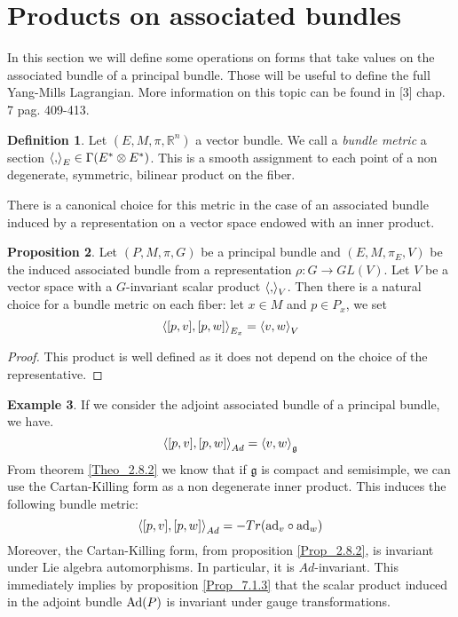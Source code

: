 \documentclass[12pt,a4paper]{report}
\theoremstyle{definition}
\newtheorem{Def}{Definition}[chapter]
\theoremstyle{Theorem}
\newtheorem{Prop}[Def]{Proposition}
\theoremstyle{definition}
\newtheorem{Ex}[Def]{Example}
\theoremstyle{definition}
\begin{document}
	\section{Products on associated bundles}
	In this section we will define some operations on forms that take values on the associated bundle of a principal bundle. Those will be useful to define the full Yang-Mills Lagrangian. More information on this topic can be found in [3] chap. 7 pag. 409-413.
	\begin{Def}
		Let $(E,M,\pi,\mathbb{R}^n)$ a vector bundle. We call a \textit{bundle metric} a section $\braket{,}_E\in \Gamma(E^*\otimes E^*)$. This is a smooth assignment to each point of a non degenerate, symmetric, bilinear product on the fiber.
	\end{Def}
	There is a canonical choice for this metric in the case of an associated bundle induced by a representation on a vector space endowed with an inner product.
	\begin{Prop}\label{Prop_7.3.1}
		Let $(P,M,\pi,G)$ be a principal bundle and $(E,M,\pi_E,V)$ be the induced associated bundle from a representation $\rho:G\rightarrow GL(V)$. Let $V$ be a vector space with a $G$-invariant scalar product $\braket{,}_V$. Then there is a natural choice for a bundle metric on each fiber: let $x\in M$ and $p\in P_x$, we set 
		$$\braket{[p,v],[p,w]}_{E_x}=\braket{v,w}_V$$
	\end{Prop}
	\begin{proof}
		This product is well defined as it does not depend on the choice of the representative.
	\end{proof}
	\begin{Ex}
		If we consider the adjoint associated bundle of a principal bundle, we have.
		$$\braket{[p,v],[p,w]}_{Ad}=\braket{v,w}_\mathfrak{g}$$
		From theorem \ref{Theo_2.8.2} we know that if $\mathfrak{g}$ is compact and semisimple, we can use the Cartan-Killing form as a non degenerate inner product. This induces the following bundle metric:
		$$\braket{[p,v],[p,w]}_{Ad}=-Tr(\hbox{ad}_v\circ\hbox{ad}_w)$$
		Moreover, the Cartan-Killing form, from proposition \ref{Prop_2.8.2}, is invariant under Lie algebra automorphisms. In particular, it is $Ad$-invariant. This immediately implies by proposition \ref{Prop_7.1.3} that the scalar product induced in the adjoint bundle $\hbox{Ad}(P)$ is invariant under gauge transformations.
	\end{Ex}
\end{document}
